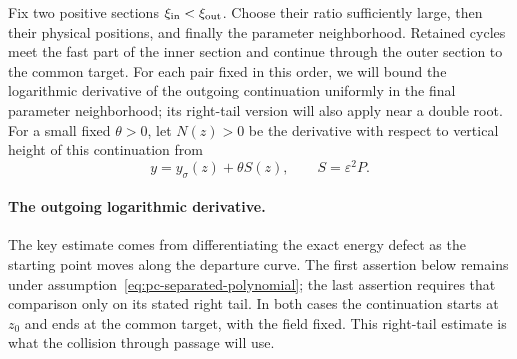 Fix two positive sections $\xi_{\rm in}<\xi_{\rm out}$. Choose their
ratio sufficiently large, then their physical positions, and finally the
parameter neighborhood. Retained cycles meet the fast part of the inner
section and continue through the outer section to the common target.
For each pair fixed in this order, we will bound the logarithmic
derivative of the outgoing continuation uniformly in the final
parameter neighborhood; its right-tail version will also apply near
a double root.
For a small fixed $\theta>0$, let $N(z)>0$ be the derivative with
respect to vertical height of this continuation from
\[
 y=y_\sigma(z)+\theta S(z),\qquad S=\varepsilon^2P.
\]

\paragraph{The outgoing logarithmic derivative.}
The key estimate comes from differentiating the exact energy defect as
the starting point moves along the departure curve. The first assertion
below remains under assumption~\eqref{eq:pc-separated-polynomial}; the
last assertion requires that comparison only on its stated right tail.
In both cases the continuation starts at $z_0$ and ends at the common
target, with the field fixed. This right-tail estimate is what the
collision through passage will use.

